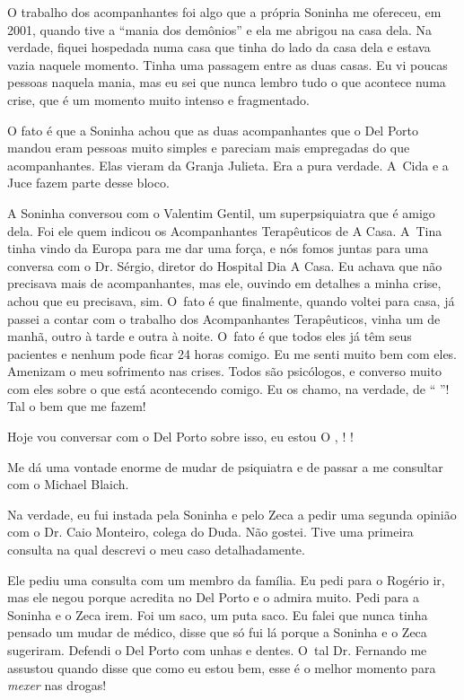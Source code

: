O trabalho dos acompanhantes foi algo que a própria Soninha me
ofereceu, em 2001, quando tive a ``mania dos demônios'' e ela me abrigou
na casa dela. Na verdade, fiquei hospedada numa casa que tinha do lado
da casa dela e estava vazia naquele momento. Tinha uma passagem entre as
duas casas. Eu vi poucas pessoas naquela mania, mas eu sei que nunca
lembro tudo o que acontece numa crise, que é um momento muito intenso e
fragmentado.

O fato é que a Soninha achou que as duas acompanhantes que o Del Porto
mandou eram pessoas muito simples e pareciam mais empregadas do que
acompanhantes. Elas vieram da Granja Julieta. Era a pura verdade. A~Cida
e a Juce fazem parte desse bloco.

A Soninha conversou com o Valentim Gentil, um superpsiquiatra que é
amigo dela. Foi ele quem indicou os Acompanhantes Terapêuticos de A
Casa. A~Tina tinha vindo da Europa para me dar uma força, e nós fomos
juntas para uma conversa com o Dr. Sérgio, diretor do Hospital Dia A
Casa. Eu achava que não precisava mais de acompanhantes, mas ele,
ouvindo em detalhes a minha crise, achou que eu precisava, sim. O~fato é
que finalmente, quando voltei para casa, já passei a contar com o
trabalho dos Acompanhantes Terapêuticos, vinha um de manhã, outro à
tarde e outra à noite. O~fato é que todos eles já têm seus pacientes e
nenhum pode ficar 24 horas comigo. Eu me senti muito bem com eles.
Amenizam o meu sofrimento nas crises. Todos são psicólogos, e converso
muito com eles sobre o que está acontecendo comigo. Eu os chamo, na
verdade, de `` \emph{}''! Tal o bem que me fazem!

Hoje vou conversar com o Del Porto sobre isso, eu estou    
O  ,    !    !

Me dá uma vontade enorme de mudar de psiquiatra e de passar a me
consultar com o Michael Blaich.

Na verdade, eu fui instada pela Soninha e pelo Zeca a pedir uma segunda
opinião com o Dr. Caio Monteiro, colega do Duda. Não gostei. Tive uma
primeira consulta na qual descrevi o meu caso detalhadamente.

Ele pediu uma consulta com um membro da família. Eu pedi para o Rogério
ir, mas ele negou porque acredita no Del Porto e o admira muito. Pedi
para a Soninha e o Zeca irem. Foi um saco, um puta saco. Eu falei que
nunca tinha pensado um mudar de médico, disse que só fui lá porque a
Soninha e o Zeca sugeriram. Defendi o Del Porto com unhas e dentes. O~tal Dr. Fernando me assustou quando disse que como eu estou bem, esse é
o melhor momento para \emph{mexer} nas drogas!

